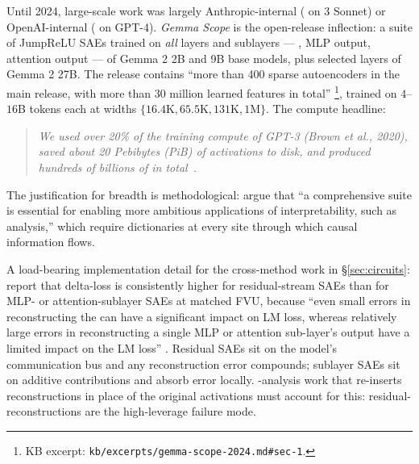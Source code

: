 Until 2024, large-scale  work was largely Anthropic-internal
(\citealp{templeton2024-scaling-monosemanticity} on  3 Sonnet)
or OpenAI-internal (\citealp{gao2024-topk-saes} on GPT-4). \emph{Gemma
Scope} \citep{gemma-scope-2024} is the open-release inflection: a
suite of JumpReLU SAEs trained on \emph{all} layers and sublayers ---
, MLP output, attention output --- of Gemma 2 2B and
9B base models, plus selected layers of Gemma 2 27B. The release
contains ``more than 400 sparse autoencoders in the main release, with
more than 30 million learned features in total''
\citep[\S 1]{gemma-scope-2024}\footnote{KB excerpt:
\texttt{kb/excerpts/gemma-scope-2024.md\#sec-1}.}, trained on
$4$--$16$B tokens each at widths $\{16.4\text{K}, 65.5\text{K},
131\text{K}, 1\text{M}\}$. The compute headline:
\begin{quote}
\itshape
We used over 20\% of the training compute of GPT-3 (Brown et al., 2020),
saved about 20 Pebibytes (PiB) of activations to disk, and produced
hundreds of billions of   in
total~\citep[\S 1]{gemma-scope-2024}.
\end{quote}
The justification for breadth is methodological:
\citet[\S 1]{gemma-scope-2024} argue that
``a comprehensive suite is essential for enabling more ambitious
applications of interpretability, such as  analysis,'' which
require  dictionaries at every site through which causal
information flows.

A load-bearing implementation detail for the cross-method work in
\S\ref{sec:circuits}: \citet[\S 4.1]{gemma-scope-2024} report that
delta-loss is consistently higher for residual-stream SAEs than for
MLP- or attention-sublayer SAEs at matched FVU, because
``even small errors in reconstructing the  can have a
significant impact on LM loss, whereas relatively large errors in
reconstructing a single MLP or attention sub-layer's output have a
limited impact on the LM loss'' \citep[\S 4.1]{gemma-scope-2024}.
Residual SAEs sit on the model's communication bus and any
reconstruction error compounds; sublayer SAEs sit on additive
contributions and absorb error locally. -analysis work that
re-inserts  reconstructions in place of the original activations
must account for this: residual- reconstructions are the
high-leverage failure mode.

